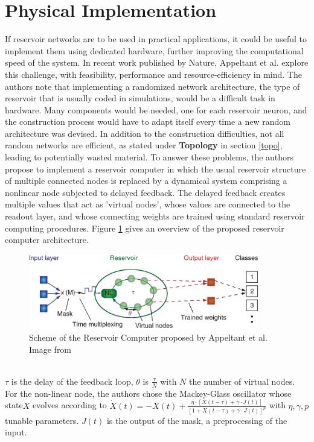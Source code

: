 \documentclass[12pt,oneside]{CUNY_CS_PhD}
\begin{document}
\section{Physical Implementation}
If reservoir networks are to be used in practical applications, it could be useful to implement them using dedicated hardware, further improving the computational speed of the system. In recent work published by Nature, Appeltant et al. \cite{appeltant2011information, appeltant_constructing_2014} 
explore this challenge, with feasibility, performance and resource-efficiency in mind. The authors note that implementing a randomized network architecture, the type of reservoir that is usually coded in simulations, would be a difficult task in hardware. Many components would be needed, one for each reservoir neuron, and the construction process would have to adapt itself every time a new random architecture was devised. In addition to the construction difficulties, not all random networks are efficient, as stated under \textbf{Topology} in section \ref{topo}, leading to potentially wasted material. To answer these problems, the authors propose to implement a reservoir computer in which the usual reservoir structure of multiple connected nodes is replaced by a dynamical system comprising a nonlinear node subjected to delayed feedback. The delayed feedback creates multiple values that act as 'virtual nodes', whose values are connected to the readout layer, and whose connecting weights are trained using standard reservoir computing procedures. Figure \ref{fig:delayed_fb} gives an overview of the proposed reservoir computer architecture.
\begin{figure}[h]
\centering
\includegraphics[width=0.9\textwidth]{pictures/delayed-feedback-res.png}
\caption{Scheme of the Reservoir Computer proposed by Appeltant et al. Image from \cite{appeltant2011information}}
\label{fig:delayed_fb}
\end{figure}\\
$\tau$ is the delay of the feedback loop, $\theta$ is $\frac{\tau}{N}$ with $N$ the number of virtual nodes. For the non-linear node, the authors chose the Mackey-Glass oscillator whose state$X$ evolves according to $\dot X (t) = -X(t) + \frac{\eta \cdot [X(t-\tau) + \gamma \cdot J(t)]}{[1+X(t-\tau) + \gamma \cdot J(t)]^p }$ with $\eta, \gamma, p$ tunable parameters. $J(t)$ is the output of the mask, a preprocessing of the input.\\
\end{document}
